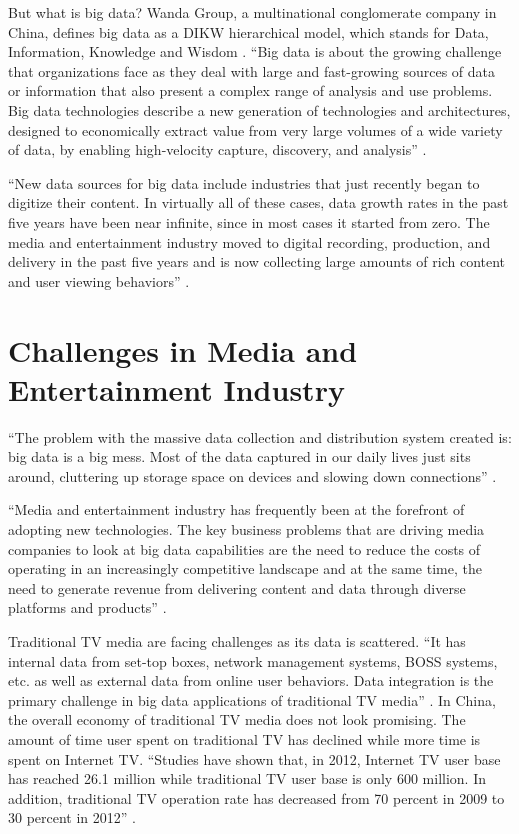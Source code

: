 \documentclass[sigconf]{acmart}
\begin{document}
But what is big data? Wanda Group, a multinational conglomerate company in China, defines big data as a DIKW hierarchical model, which stands for Data, Information, Knowledge and Wisdom \cite{Zhang2017era}. ``Big data is about the growing challenge that organizations face as they deal with large and fast-growing sources of data or information that also present a complex range of analysis and use problems. Big data technologies describe a new generation of technologies and architectures, designed to economically extract value from very large volumes of a wide variety of data, by enabling high-velocity capture, discovery, and analysis'' \cite{Villars2011care}. 

``New data sources for big data include industries that just recently began to digitize their content. In virtually all of these cases, data growth rates in the past five years have been near infinite, since in most cases it started from zero. The media and entertainment industry moved to digital recording, production, and delivery in the past five years and is now collecting large amounts of rich content and user viewing behaviors'' \cite{Villars2011care}.

\section{Challenges in Media and Entertainment Industry}

``The problem with the massive data collection and distribution system created is: big data is a big mess. Most of the data captured in our daily lives just sits around, cluttering up storage space on devices and slowing down connections'' \cite{Schlieski2012data}.

``Media and entertainment industry has frequently been at the forefront of adopting new technologies. The key business problems that are driving media companies to look at big data capabilities are the need to reduce the costs of operating in an increasingly competitive landscape and at the same time, the need to generate revenue from delivering content and data through diverse platforms and products'' \cite{Lippell2016sectors}.

Traditional TV media are facing challenges as its data is scattered. ``It has internal data from set-top boxes, network management systems, BOSS systems, etc. as well as external data from online user behaviors. Data integration is the primary challenge in big data applications of traditional TV media'' \cite{Zhang2017era}. In China, the overall economy of traditional TV media does not look promising. The amount of time user spent on traditional TV has declined while more time is spent on Internet TV. ``Studies have shown that, in 2012, Internet TV user base has reached 26.1 million while traditional TV user base is only 600 million. In addition, traditional TV operation rate has decreased from 70 percent in 2009 to 30 percent in 2012'' \cite{Zhang2017era}. 
\end{document}
